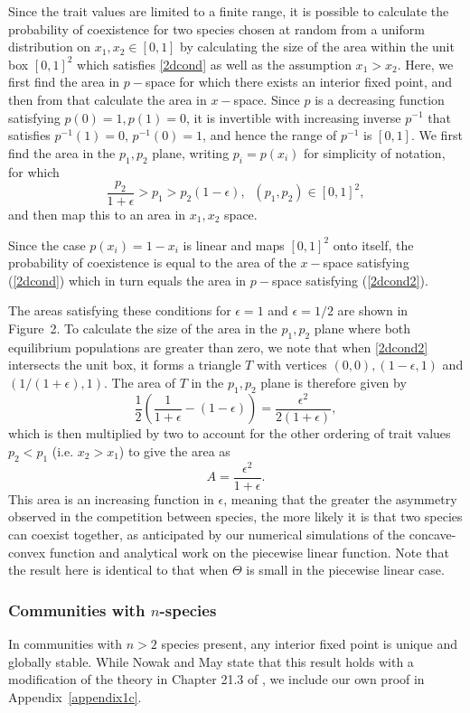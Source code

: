 Since the trait values are limited to a finite range, it is possible to calculate the probability of coexistence for two species chosen at random from a uniform distribution on $x_1,x_2 \in [0,1]$  by calculating the size of the area within the unit box $[0,1]^2$ which satisfies \eqref{2dcond} as well as the assumption $x_1>x_2$. Here, we first find the area in $p-$space for which there exists an interior fixed point, and then from that calculate the area in $x-$space. Since $p$ is a decreasing function satisfying $p(0)=1, p(1)=0$, it is invertible with increasing inverse $p^{-1}$ that satisfies $p^{-1}(1)=0, \, p^{-1}(0)=1$, and hence the range of $p^{-1}$ is $[0,1]$. We first find the area in the $p_1,p_2$ plane, writing $p_i=p(x_i)$ for simplicity of notation, for which
\begin{equation}
\label{2dcond2}
\frac{p_2}{1+\epsilon}>p_1>p_2(1-\epsilon),\;\; (p_1,p_2)\in [0,1]^2,
\end{equation}
and then map this to an area in $x_1,x_2$ space.


Since the case $p(x_i)=1-x_i$ is linear and maps $[0,1]^2$ onto itself, the probability of coexistence is equal to the area of the $x-$space satisfying (\ref{2dcond}) which in turn equals the area in $p-$space satisfying (\ref{2dcond2}).

The areas satisfying these conditions for $\epsilon=1$ and $\epsilon=1/2$ are shown in Figure~2. To calculate the size of the area in the $p_1,p_2$ plane where both equilibrium populations are greater than zero, we note that when \eqref{2dcond2} intersects the unit box, it forms a triangle $T$ with vertices $(0,0),(1-\epsilon,1)$ and $(1/(1+\epsilon),1)$. The area of $T$ in the $p_1,p_2$ plane is therefore given by
\[
\frac{1}{2}\left(\frac{1}{1+\epsilon}-(1-\epsilon)\right)=\frac{\epsilon^2}{2(1+\epsilon)},
\]
which is then multiplied by two to account for the other ordering of trait values $p_2<p_1$ (i.e. $x_2>x_1$) to give the area as
\[
A =\frac{\epsilon^2}{1+\epsilon}.
\]
This area is an increasing function in $\epsilon$, meaning that the greater the asymmetry observed in the competition between species, the more likely it is that two species can coexist together, as anticipated by our numerical simulations of the concave-convex function and analytical work on the piecewise linear function. Note that the result here is identical to that when $\Theta$ is small in the piecewise linear case.

 
\subsubsection{Communities with $n$-species}
In communities with $n>2$ species present,  any interior fixed point is unique and globally stable. While Nowak and May \cite{nowak1994superinfection} state that this result holds with a modification of the theory in Chapter 21.3 of \cite{hofbauer1998evolutionary}, we include our own proof in Appendix~\ref{appendix1c}. 


